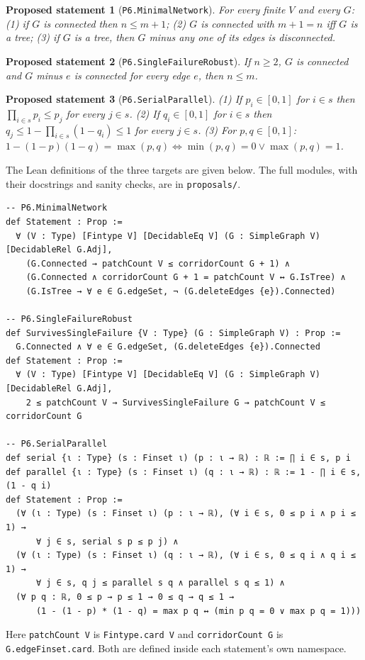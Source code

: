 \documentclass[11pt]{article}
\newtheorem{proposal}{Proposed statement}
\begin{document}
\begin{proposal}[\texttt{P6.MinimalNetwork}]
For every finite $V$ and every $G$:
(1) if $G$ is connected then $n\le m+1$;
(2) $G$ is connected with $m+1=n$ iff $G$ is a tree;
(3) if $G$ is a tree, then $G$ minus any one of its edges is disconnected.
\end{proposal}

\begin{proposal}[\texttt{P6.SingleFailureRobust}]
If $n\ge 2$, $G$ is connected and $G$ minus $e$ is connected for every edge $e$, then $n\le m$.
\end{proposal}

\begin{proposal}[\texttt{P6.SerialParallel}]
(1) If $p_i\in[0,1]$ for $i\in s$ then $\prod_{i\in s}p_i\le p_j$ for every $j\in s$.
(2) If $q_i\in[0,1]$ for $i\in s$ then $q_j\le 1-\prod_{i\in s}(1-q_i)\le 1$ for every $j\in s$.
(3) For $p,q\in[0,1]$: $1-(1-p)(1-q)=\max(p,q)\iff \min(p,q)=0\lor\max(p,q)=1$.
\end{proposal}

The Lean definitions of the three targets are given below. The full modules, with their docstrings and
sanity checks, are in \texttt{proposals/}.

\begin{lstlisting}
-- P6.MinimalNetwork
def Statement : Prop :=
  ∀ (V : Type) [Fintype V] [DecidableEq V] (G : SimpleGraph V) [DecidableRel G.Adj],
    (G.Connected → patchCount V ≤ corridorCount G + 1) ∧
    (G.Connected ∧ corridorCount G + 1 = patchCount V ↔ G.IsTree) ∧
    (G.IsTree → ∀ e ∈ G.edgeSet, ¬ (G.deleteEdges {e}).Connected)

-- P6.SingleFailureRobust
def SurvivesSingleFailure {V : Type} (G : SimpleGraph V) : Prop :=
  G.Connected ∧ ∀ e ∈ G.edgeSet, (G.deleteEdges {e}).Connected
def Statement : Prop :=
  ∀ (V : Type) [Fintype V] [DecidableEq V] (G : SimpleGraph V) [DecidableRel G.Adj],
    2 ≤ patchCount V → SurvivesSingleFailure G → patchCount V ≤ corridorCount G

-- P6.SerialParallel
def serial {ι : Type} (s : Finset ι) (p : ι → ℝ) : ℝ := ∏ i ∈ s, p i
def parallel {ι : Type} (s : Finset ι) (q : ι → ℝ) : ℝ := 1 - ∏ i ∈ s, (1 - q i)
def Statement : Prop :=
  (∀ (ι : Type) (s : Finset ι) (p : ι → ℝ), (∀ i ∈ s, 0 ≤ p i ∧ p i ≤ 1) →
      ∀ j ∈ s, serial s p ≤ p j) ∧
  (∀ (ι : Type) (s : Finset ι) (q : ι → ℝ), (∀ i ∈ s, 0 ≤ q i ∧ q i ≤ 1) →
      ∀ j ∈ s, q j ≤ parallel s q ∧ parallel s q ≤ 1) ∧
  (∀ p q : ℝ, 0 ≤ p → p ≤ 1 → 0 ≤ q → q ≤ 1 →
      (1 - (1 - p) * (1 - q) = max p q ↔ (min p q = 0 ∨ max p q = 1)))
\end{lstlisting}
Here \texttt{patchCount V} is \texttt{Fintype.card V} and \texttt{corridorCount G} is
\texttt{G.edgeFinset.card}. Both are defined inside each statement's own namespace.
\end{document}
